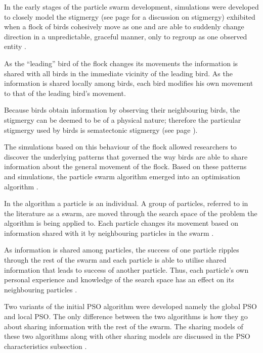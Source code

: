 In the early stages of the particle swarm development, simulations were developed to closely model the stigmergy (see page \pageref{sec:stigmergy} for a discussion on stigmergy) exhibited when a flock of birds cohesively move as one and are able to suddenly change direction in a unpredictable, graceful manner, only to regroup as one observed entity \cite{PSOHybridJobShop}. 

As the ``leading'' bird of the flock changes its movements the information is shared with all birds in the immediate vicinity of the leading bird. As the information is shared locally among birds, each bird modifies his own movement to that of the leading bird's movement\cite{PSOHybridJobShop}. 

Because birds obtain information by observing their neighbouring birds, the stigmergy can be deemed to be of a physical nature; therefore the particular stigmergy used by birds is sematectonic stigmergy (see page \pageref{def:sematectonic}).

The simulations based on this behaviour of the flock allowed researchers to discover the underlying patterns that governed the way birds are able to share information about the general movement of the flock. Based on these patterns and simulations, the particle swarm algorithm emerged into an optimisation algorithm \cite{CompuIntelligenceIntro}.

In the algorithm a particle is an individual\cite{FundamentalSwarm}. A group of particles, referred to in the literature as a swarm,  are moved through the search space of the problem the algorithm is being applied to\cite{FundamentalSwarm}. Each particle changes its movement based on information shared with it by neighbouring particles in the swarm \cite{FundamentalSwarm,CompuIntelligenceIntro}. 

As information is shared among particles, the success of one particle ripples through the rest of the swarm and each particle is able to utilise shared information that leads to success of another particle. Thus, each particle's own personal experience and knowledge of the search space has an effect on its neighbouring particles \cite{FundamentalSwarm,CompuIntelligenceIntro}.

Two variants of the initial \gls{PSO} algorithm were developed namely the global \gls{PSO} and local \gls{PSO}. The only difference between the two algorithms is how they go about sharing information with the rest of the swarm. The sharing models of these two algorithms along with other sharing models are discussed in the \gls{PSO} characteristics subsection \cite{SOSwarm}.

